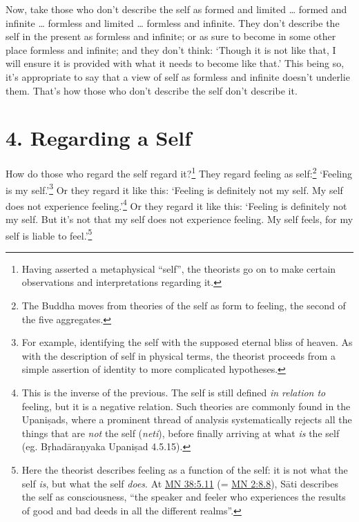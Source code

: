 \documentclass[12pt,openany]{book}%
\begin{document}
Now, take those who don’t describe the self as formed and limited … formed and infinite … formless and limited … formless and infinite. They don’t describe the self in the present as formless and infinite; or as sure to become in some other place formless and infinite; and they don’t think: ‘Though it is not like that, I will ensure it is provided with what it needs to become like that.’ This being so, it’s appropriate to say that a view of self as formless and infinite doesn’t underlie them. That’s how those who don’t describe the self don’t describe it. 

\section*{4. Regarding a Self }

How do those who regard the self regard it?\footnote{Having asserted a metaphysical “self”, the theorists go on to make certain observations and interpretations regarding it. } They regard feeling as self:\footnote{The Buddha moves from theories of the self as form to feeling, the second of the five aggregates. } ‘Feeling is my self.’\footnote{For example, identifying the self with the supposed eternal bliss of heaven. As with the description of self in physical terms, the theorist proceeds from a simple assertion of identity to more complicated hypotheses. } Or they regard it like this: ‘Feeling is definitely not my self. My self does not experience feeling.’\footnote{This is the inverse of the previous. The self is still defined \emph{in relation to} feeling, but it is a negative relation. Such theories are commonly found in the \textsanskrit{Upaniṣads}, where a prominent thread of analysis systematically rejects all the things that are \emph{not} the self (\textit{neti}), before finally arriving at what \emph{is} the self (eg. \textsanskrit{Bṛhadāraṇyaka} \textsanskrit{Upaniṣad} 4.5.15). } Or they regard it like this: ‘Feeling is definitely not my self. But it’s not that my self does not experience feeling. My self feels, for my self is liable to feel.’\footnote{Here the theorist describes feeling as a function of the self: it is not what the self \emph{is}, but what the self \emph{does}. At \href{https://suttacentral.net/mn38/en/sujato\#5.11}{MN 38:5.11} (= \href{https://suttacentral.net/mn2/en/sujato\#8.8}{MN 2:8.8}), \textsanskrit{Sāti} describes the self as consciousness, “the speaker and feeler who experiences the results of good and bad deeds in all the different realms”. } 
\end{document}
